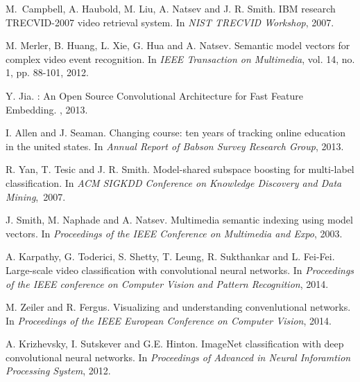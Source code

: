 \documentclass[11pt,twocolumn,twoside]{IEEEtran}
\begin{document}
 \scriptsize
\begin{thebibliography}{1}


M.~Campbell, A. Haubold, M. Liu, A. Natsev and J. R. Smith.
\newblock IBM research TRECVID-2007 video retrieval system.
\newblock In {\em NIST TRECVID Workshop}, 2007.


M. Merler, B. Huang, L. Xie, G. Hua and A. Natsev.
\newblock Semantic model vectors for complex video event recognition.
\newblock In {\em IEEE Transaction on Multimedia}, vol. 14, no. 1, pp. 88-101, 2012.

Y. Jia.
: An Open Source Convolutional Architecture for Fast Feature Embedding.
, 2013.

I. Allen and J. Seaman.
\newblock Changing course: ten years of tracking online education in the united states.
\newblock In {\em Annual Report of Babson Survey Research Group}, 2013.

R. Yan, T. Tesic and J. R. Smith.
\newblock Model-shared subspace boosting for multi-label classification.
\newblock In {\em ACM SIGKDD Conference on Knowledge Discovery and Data Mining},~2007.


J. Smith, M. Naphade and A. Natsev.
\newblock Multimedia semantic indexing using model vectors.
\newblock In {\em Proceedings of the IEEE Conference on Multimedia and Expo}, 2003.


A. Karpathy, G. Toderici, S. Shetty, T. Leung, R. Sukthankar and L. Fei-Fei.
\newblock Large-scale video classification with convolutional neural networks.
\newblock In {\em Proceedings of the IEEE conference on Computer Vision and Pattern Recognition}, 2014.


M. Zeiler and R. Fergus.
\newblock Visualizing and understanding convenlutional networks.
\newblock In {\em Proceedings of the IEEE European Conference on Computer Vision}, 2014.


A. Krizhevsky, I. Sutskever and G.E. Hinton.
\newblock ImageNet classification with deep convolutional neural networks.
\newblock In {\em Proceedings of Advanced in Neural Inforamtion Processing System}, 2012.



\end{thebibliography}
\end{document}
